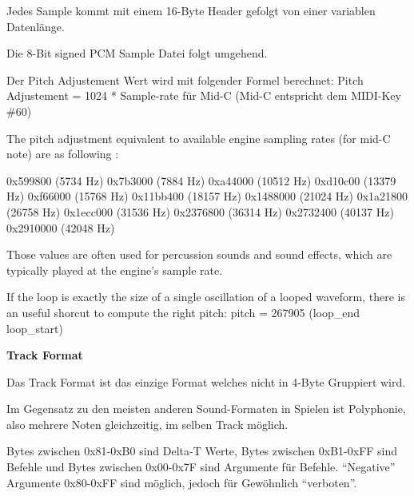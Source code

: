 \documentclass[11pt,a4paper]{scrartcl}
\begin{document}
Jedes Sample kommt mit einem 16-Byte Header gefolgt von einer variablen Datenl\"{a}nge.

Die 8-Bit signed PCM Sample Datei folgt umgehend.

Der Pitch Adjustement Wert wird mit folgender Formel berechnet:\newline
Pitch Adjustement = 1024 * Sample-rate f\"{u}r Mid-C (Mid-C entspricht dem MIDI-Key \#60)

The pitch adjustment equivalent to available engine sampling rates (for mid-C note) are as following :

0x599800  (5734 Hz)\newline
0x7b3000  (7884 Hz)\newline
0xa44000  (10512 Hz)\newline
0xd10c00  (13379 Hz)\newline
0xf66000  (15768 Hz)\newline
0x11bb400 (18157 Hz)\newline
0x1488000 (21024 Hz)\newline
0x1a21800 (26758 Hz)\newline
0x1ecc000 (31536 Hz)\newline
0x2376800 (36314 Hz)\newline
0x2732400 (40137 Hz)\newline
0x2910000 (42048 Hz)\newline

Those values are often used for percussion sounds and sound effects, which are typically played at the engine's sample rate.

If the loop is exactly the size of a single oscillation of a looped waveform, there is an useful shorcut to compute the right pitch:
pitch = 267905 \* (loop\_end \- loop\_start)

\vspace{15pt}
\textbf{{\large Track Format}}

Das Track Format ist das einzige Format welches nicht in 4-Byte Gruppiert wird.

Im Gegensatz zu den meisten anderen Sound-Formaten in Spielen ist Polyphonie, also mehrere Noten gleichzeitig, im selben Track m\"{o}glich.

Bytes zwischen 0x81-0xB0 sind Delta-T Werte, Bytes zwischen 0xB1-0xFF sind Befehle und Bytes zwischen 0x00-0x7F sind Argumente f\"{u}r Befehle.
"`Negative"' Argumente 0x80-0xFF sind m\"{o}glich, jedoch f\"{u}r Gew\"{o}hnlich "`verboten"'.
\end{document}
